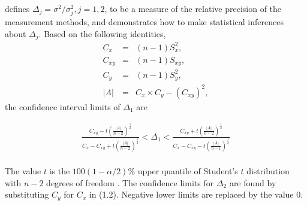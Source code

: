 \documentclass[12pt, a4paper]{report}
\theoremstyle{plain}
\theoremstyle{definition}
\theoremstyle{remark}
\begin{document}

\citet{Thompson} defines $\Delta_j = \sigma^2 / \sigma^2_j, j=1,2$, to be a measure of the
relative precision of the measurement methods, and demonstrates how to make statistical inferences about $\Delta_{j}$.
Based on the following identities,
\begin{eqnarray*}
	C_{x}&=&(n-1)S^2_{x},\nonumber\\
	C_{xy}&=&(n-1)S_{xy},\nonumber\\
	C_{y}&=&(n-1)S^2_{y},\nonumber\\
	|A| &=& C_{x}\times C_{y} - (C_{xy})^2,\nonumber
\end{eqnarray*}
\noindent the confidence interval limits of $\Delta_{1}$ are

\begin{eqnarray}
\frac{C_{xy}-
	t(\frac{|A|}{n-2})^{\frac{1}{2}}}{C_{x}-C_{xy}+
	t(\frac{|A|}{n-2})^{\frac{1}{2}}} <
\Delta_{1} < \frac{C_{xy}+
	t(\frac{|A|}{n-2})^{\frac{1}{2}}}{C_{x}-C_{xy}-
	t(\frac{|A|}{n-1})^{\frac{1}{2}}} \nonumber
\end{eqnarray}
\\ The value $t$ is the $100(1-\alpha/2)\%$ upper quantile of
Student's $t$ distribution with $n-2$ degrees of freedom
\citep{Kinsella}. The confidence limits for $\Delta_{2}$ are found by substituting $C_{y}$ for $C_{x}$ in (1.2).
Negative lower limits are replaced by the value $0$.


\end{document}
